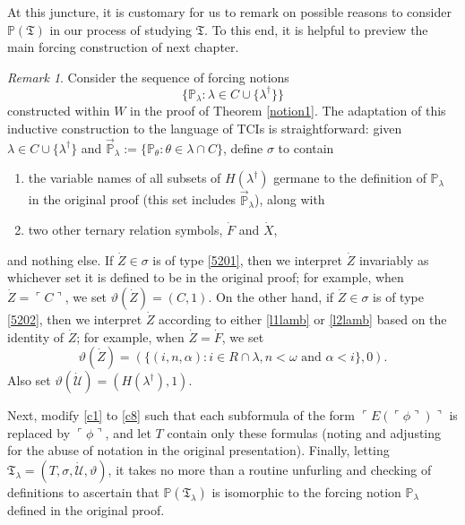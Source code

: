 \documentclass[12pt, twoside]{memoir}
\numberwithin{equation}{section}
\theoremstyle{definition}
\theoremstyle{remark}
\newtheorem{rem}[thm]{Remark}
\theoremstyle{definition}
\theoremstyle{definition}
\theoremstyle{definition}
\theoremstyle{remark}
\begin{document}
At this juncture, it is customary for us to remark on possible reasons to consider $\mathbb{P}(\mathfrak{T})$ in our process of studying $\mathfrak{T}$. To this end, it is helpful to preview the main forcing construction of next chapter.

\begin{rem}\label{rem520}
Consider the sequence of forcing notions $$\{\mathbb{P}_{\lambda} : \lambda \in C \cup \{\lambda^{\dagger}\}\}$$ constructed within $W$ in the proof of Theorem \ref{notion1}. The adaptation of this inductive construction to the language of TCIs is straightforward: given $\lambda \in C \cup \{\lambda^{\dagger}\}$ and $\Vec{\mathbb{P}}_{\lambda} := \{\mathbb{P}_{\theta} : \theta \in \lambda \cap C\}$, define $\sigma$ to contain
\begin{enumerate}[label=(\Alph*)]
    \item\label{5201} the variable names of all subsets of $H(\lambda^{\dagger})$ germane to the definition of $\mathbb{P}_{\lambda}$ in the original proof (this set includes $\Vec{\mathbb{P}}_{\lambda}$), along with
    \item\label{5202} two other ternary relation symbols, $\dot{F}$ and $\dot{X}$,
\end{enumerate}
and nothing else. If $\dot{Z} \in \sigma$ is of type \ref{5201}, then we interpret $\dot{Z}$ invariably as whichever set it is defined to be in the original proof; for example, when $\dot{Z} = \ulcorner C \urcorner$, we set $\vartheta (\dot{Z}) = (C, 1)$. On the other hand, if $\dot{Z} \in \sigma$ is of type \ref{5202}, then we interpret $\dot{Z}$ according to either \ref{l1lamb} or \ref{l2lamb} based on the identity of $\dot{Z}$; for example, when $\dot{Z} = \dot{F}$,  we set $$\vartheta (\dot{Z}) = (\{(i, n, \alpha) : i \in R \cap \lambda, n < \omega \text{ and } \alpha < i\}, 0).$$ Also set $\vartheta (\dot{\mathcal{U}}) = (H(\lambda^{\dagger}), 1)$. 

Next, modify \ref{c1} to \ref{c8} such that each subformula of the form $\ulcorner E(\ulcorner \phi \urcorner) \urcorner$ is replaced by $\ulcorner \phi \urcorner$, and let $T$ contain only these formulas (noting and adjusting for the abuse of notation in the original presentation). Finally, letting $\mathfrak{T}_{\lambda} = (T, \sigma, \dot{\mathcal{U}}, \vartheta)$, it takes no more than a routine unfurling and checking of definitions to ascertain that $\mathbb{P}(\mathfrak{T}_{\lambda})$ is isomorphic to the forcing notion $\mathbb{P}_{\lambda}$ defined in the original proof.
\end{rem}
\end{document}

